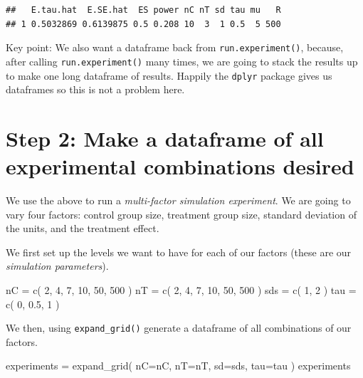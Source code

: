 \documentclass[
]{book}
\newenvironment{Shaded}{\begin{snugshade}}{\end{snugshade}}
\newcommand{\AttributeTok}[1]{\textcolor[rgb]{0.77,0.63,0.00}{#1}}
\newcommand{\DecValTok}[1]{\textcolor[rgb]{0.00,0.00,0.81}{#1}}
\newcommand{\FloatTok}[1]{\textcolor[rgb]{0.00,0.00,0.81}{#1}}
\newcommand{\FunctionTok}[1]{\textcolor[rgb]{0.00,0.00,0.00}{#1}}
\newcommand{\NormalTok}[1]{#1}
\newcommand{\OtherTok}[1]{\textcolor[rgb]{0.56,0.35,0.01}{#1}}
\begin{document}
\begin{verbatim}
##   E.tau.hat  E.SE.hat  ES power nC nT sd tau mu   R
## 1 0.5032869 0.6139875 0.5 0.208 10  3  1 0.5  5 500
\end{verbatim}

Key point: We also want a dataframe back from \texttt{run.experiment()}, because,
after calling \texttt{run.experiment()} many times, we are going to stack the
results up to make one long dataframe of results. Happily the \texttt{dplyr}
package gives us dataframes so this is not a problem here.

\hypertarget{step-2-make-a-dataframe-of-all-experimental-combinations-desired}{%
\section{Step 2: Make a dataframe of all experimental combinations desired}\label{step-2-make-a-dataframe-of-all-experimental-combinations-desired}}

We use the above to run a \emph{multi-factor simulation experiment}. We are
going to vary four factors: control group size, treatment group size,
standard deviation of the units, and the treatment effect.

We first set up the levels we want to have for each of our factors
(these are our \emph{simulation parameters}).

\begin{Shaded}
\begin{Highlighting}[]
\NormalTok{nC }\OtherTok{=} \FunctionTok{c}\NormalTok{( }\DecValTok{2}\NormalTok{, }\DecValTok{4}\NormalTok{, }\DecValTok{7}\NormalTok{, }\DecValTok{10}\NormalTok{, }\DecValTok{50}\NormalTok{, }\DecValTok{500}\NormalTok{ )}
\NormalTok{nT }\OtherTok{=} \FunctionTok{c}\NormalTok{( }\DecValTok{2}\NormalTok{, }\DecValTok{4}\NormalTok{, }\DecValTok{7}\NormalTok{, }\DecValTok{10}\NormalTok{, }\DecValTok{50}\NormalTok{, }\DecValTok{500}\NormalTok{ )}
\NormalTok{sds }\OtherTok{=} \FunctionTok{c}\NormalTok{( }\DecValTok{1}\NormalTok{, }\DecValTok{2}\NormalTok{ )}
\NormalTok{tau }\OtherTok{=} \FunctionTok{c}\NormalTok{( }\DecValTok{0}\NormalTok{, }\FloatTok{0.5}\NormalTok{, }\DecValTok{1}\NormalTok{ )}
\end{Highlighting}
\end{Shaded}

We then, using \texttt{expand\_grid()} generate a dataframe of all
combinations of our factors.

\begin{Shaded}
\begin{Highlighting}[]
\NormalTok{experiments }\OtherTok{=} \FunctionTok{expand\_grid}\NormalTok{( }\AttributeTok{nC=}\NormalTok{nC, }\AttributeTok{nT=}\NormalTok{nT, }\AttributeTok{sd=}\NormalTok{sds, }\AttributeTok{tau=}\NormalTok{tau )}
\NormalTok{experiments}
\end{Highlighting}
\end{Shaded}
\end{document}
